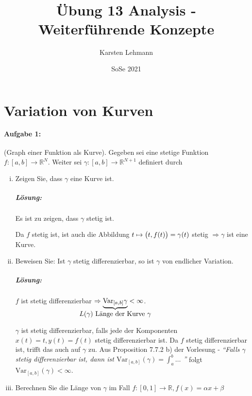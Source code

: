 \documentclass{scrreprt}
\author{Karsten Lehmann}
\date{SoSe 2021}
\title{Übung 13 Analysis - Weiterführende Konzepte}
\begin{document}
\setcounter{chapter}{1}
\section*{Variation von Kurven}
\paragraph{Aufgabe 1:} (Graph einer Funktion als Kurve).
Gegeben sei eine stetige Funktion $f \colon [a, b] \to \mathbb{R}^N$.
Weiter sei $\gamma \colon [a, b] \to \mathbb{R}^{N + 1}$ definiert durch
\begin{enumerate}[(i)]
\item Zeigen Sie, dass $\gamma$ eine Kurve ist.
  \subparagraph{Lösung:} Es ist zu zeigen, dass $\gamma$ stetig ist.

  Da $f$ stetig ist, ist auch die Abbildung
  $t \mapsto \qty\big(t, f(t)) = \gamma(t)$ stetig
  $\Rightarrow \gamma$ ist eine Kurve.

\item Beweisen Sie: Ist $\gamma$ stetig differenzierbar, so ist
  $\gamma$ von endlicher Variation.

  \subparagraph{Lösung:} $f$ ist stetig differenzierbar
  $\Rightarrow \underset{\makebox[0pt]{$L(\gamma)$ Länge der Kurve $\gamma$}}{
    \underbrace{\text{Var}_{[a, b]} \gamma}
  } < \infty$.

  $\gamma$ ist stetig differenzierbar, falls jede der Komponenten
  $x(t) = t, y(t) = f(t)$ stetig differenzierbar ist.
  Da $f$ stetig differenzierbar ist, trifft das auch auf $\gamma$
  zu.
  Aus Proposition 7.7.2 b) der Vorlesung -
  \textit{``Falls $\gamma$ stetig differenzierbar ist, dann ist
    $\text{Var}_{[a,b]}(\gamma) = \int_a^b \ldots$
  ''} folgt $\text{Var}_{[a,b]}(\gamma) < \infty$.

\item Berechnen Sie die Länge von $\gamma$ im Fall
  $f \colon [0, 1] \to \mathbb{R}, f(x) = \alpha x + \beta$
\end{enumerate}
\end{document}
